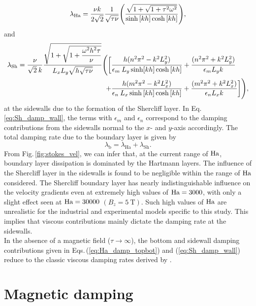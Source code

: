 \documentclass[aps,prfluids,reprint,superscriptaddress]{revtex4-2}
\newcommand{\ii}[1]{\text{#1}}
\newcommand{\nn}{\nonumber}
\begin{document}
\begin{equation}
	\lambda_{\rm Ha}
	= 
	\frac{\nu k}{2\sqrt{2}}
	\frac{1}{\sqrt{\tau\nu}}
	\Biggl(
	\frac{\sqrt{1 + \sqrt{1 + \tau^2\omega^2} }}{\sinh{[kh]}\cosh{[kh]}}
	\Biggr),
	\label{eq:Ha_damp_topbot}
\end{equation}
and 
\begin{align}
	\nn
	\lambda_{\rm Sh}=
	\frac{\nu}{\sqrt{2}\:k}
	\frac{
		\sqrt{ 1 + \sqrt{1 + \dfrac{\omega^2h^2\tau}{\nu}}}
	}{L_xL_y\sqrt{h\sqrt{\tau\nu}}}
	\Biggl( \biggl[
	&\dfrac{  h(n^2\pi^2  - k^2L_y^2)}{ \epsilon_{m}\: L_y\sinh[kh]\cosh{[kh]}}
	+ \dfrac{ (n^2\pi^2 + k^2L_y^2)}{ \epsilon_m L_y  k}
	\\
	+
	&\dfrac{h(m^2\pi^2  - k^2L_x^2)}{ \epsilon_n \: L_x \sinh{[kh]}\cosh{[kh]}}
	+
	\dfrac{  (m^2\pi^2 + k^2L_x^2)}{ \epsilon_n L_x k}
	\biggr] \Biggr) ,
	\label{eq:Sh_damp_wall}
\end{align}   
at the sidewalls due to the formation of the Shercliff layer. In Eq.\,\eqref{eq:Sh_damp_wall}, the terms with $\epsilon_m$ and $\epsilon_n$ correspond to the damping contributions from the sidewalls normal to the $x$- and $y$-axis accordingly. The total damping rate due to the boundary layer is given by
\begin{equation}
	\lambda_{\ii b} = \lambda_{\ii{Ha}} + \lambda_{\ii{Sh}}.
	\label{eq:tot_damping_Ha+Sh}
\end{equation}
\indent From Fig.\,\ref{fig:stokes_vel}, we can infer that, at the current range of $\rm Ha$, boundary layer dissipation is dominated by the Hartmann layers. The influence of the Shercliff layer in the sidewalls is found to be negligible within the range of $\rm Ha$ considered. The Shercliff boundary layer has nearly indistinguishable influence on the velocity gradients even at extremely high values of $\rm Ha = 3000$, with only a slight effect seen at $\rm Ha=30000$ $(B_z=\SI{5}{\tesla})$. Such high values of $\rm Ha$ are unrealistic for the industrial and experimental models specific to this study.  This implies that viscous contributions mainly dictate the damping rate at the sidewalls.
\\
\indent In the absence of a magnetic field ($\tau \rightarrow \infty$), the bottom and sidewall damping contributions given in Eqs.\,(\ref{eq:Ha_damp_topbot}) and (\ref{eq:Sh_damp_wall}) reduce to the classic viscous damping rates derived by \citet{Keulegan1959}. 



\section{Magnetic damping}
\label{sec:mag_damp}
\end{document}

